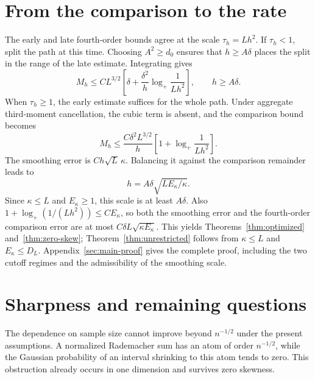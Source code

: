 \documentclass[11pt,letterpaper]{article}
\theoremstyle{remark}
\begin{document}
\section{From the comparison to the rate}
The early and late fourth-order bounds agree at the scale
\(\tau_h=Lh^2\). If \(\tau_h<1\), split the path at this time.
Choosing \(A^2\ge d_0\) ensures that \(h\ge A\delta\) places
the split in the range of the late estimate. Integrating gives
\[
 M_h\le CL^{3/2}\left[
 \delta+\frac{\delta^2}{h}\log_+\frac1{Lh^2}\right],
 \qquad h\ge A\delta.
\]
When \(\tau_h\ge1\), the early estimate suffices for the whole path.
Under aggregate third-moment cancellation, the cubic term is absent,
and the comparison bound becomes
\[
 M_h\le\frac{C\delta^2L^{3/2}}h
 \left[1+\log_+\frac1{Lh^2}\right].
\]
The smoothing error is \(Ch\sqrt L\,\kappa\). Balancing it against
the comparison remainder leads to
\[
 h=A\delta\sqrt{LE_\kappa/\kappa}.
\]
Since \(\kappa\le L\) and \(E_\kappa\ge1\), this scale is at
least \(A\delta\). Also
\(1+\log_+(1/(Lh^2))\le CE_\kappa\), so both the smoothing
error and the fourth-order comparison error are at most
\(C\delta L\sqrt{\kappa E_\kappa}\).
This yields Theorems~\ref{thm:optimized} and~\ref{thm:zero-skew};
Theorem~\ref{thm:unrestricted} follows from \(\kappa\le L\) and
\(E_\kappa\le D_L\). Appendix~\ref{sec:main-proof} gives the complete proof, including
the two cutoff regimes and the admissibility of the smoothing scale.


\section{Sharpness and remaining questions}\label{opt:section}
The dependence on sample size cannot improve beyond \(n^{-1/2}\)
under the present assumptions. A normalized Rademacher sum has an atom
of order \(n^{-1/2}\), while the Gaussian probability of an interval
shrinking to this atom tends to zero. This obstruction already occurs
in one dimension and survives zero skewness.
\end{document}
